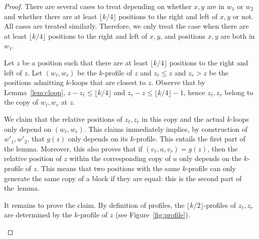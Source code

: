 \documentclass{LMCS}
\newcommand\kloops{$k$-loops\xspace}
\newcommand\profile[1]{$#1$-profile\xspace}
\newcommand\profiles[1]{$#1$-profiles\xspace}
\newcommand\kprofile{\profile{k}}
\let\leq\leqslant
\theoremstyle{plain}
\begin{document}
\begin{proof}
  There are several cases to treat depending on whether $x,y$ are in
  $w_1$ or $w_2$ and whether there are at least $\lfloor k/4\rfloor$
  positions to the right and left of $x,y$ or not. All cases are
  treated similarly. Therefore, we only treat the case when there are
  at least $\lfloor k/4\rfloor$ positions to the right and left of
  $x,y$, and positions $x,y$ are both in $w_1$.

  Let $z$ be a position such that there are at least $\lfloor k/4
  \rfloor$ positions to the right and left of $z$. Let $(w_\ell,w_r)$
  be the \kprofile of $z$ and $z_\ell \leq z$ and $z_r > z$ be the
  positions admitting \kloops that are closest to $z$. Observe that by
  Lemma~\ref{lem:cloop}, $z-z_\ell \leq {\lfloor k/4\rfloor}$ and $z_r-z
  \leq {\lfloor k/4\rfloor} - 1$, hence $z_\ell,z_r$ belong to the copy of $w_\ell,w_r$
  at $z$.

  We claim that  the relative positions of $z_\ell,z_r$ in this copy and the
  actual \kloops only depend on $(w_\ell,w_r)$. This claims immediately implies,
  by construction of $w'_1,w'_2$, that $g(z)$ only depends on its
  \kprofile. This entails the first part of the lemma. Moreover,
  this also proves that if $(v_\ell,u,v_r) = g(z)$, then the relative
  position of $z$ within the corresponding copy of $u$ only depends on
  the \kprofile of $z$. This means that two positions with the same
  \kprofile can only generate the same copy of a block if they are
  equal: this is the second part of the~lemma.

  It remains to prove the claim. By definition of profiles, the
  \profiles{\lfloor k/2\rfloor} of $z_\ell,z_r$ are determined
  by the \kprofile of $z$ (see Figure~\ref{fig:profile}).
  \begin{figure}[h]
    \begin{center}
\end{center}
\end{figure}
\end{proof}
\end{document}
